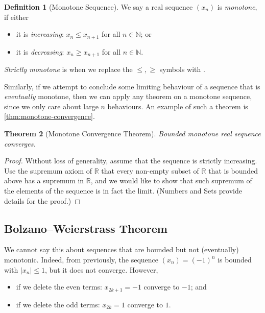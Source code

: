 \documentclass[11pt]{article}
\numberwithin{equation}{section}
\newtheorem{theorem}{Theorem}[section]
\theoremstyle{definition}
\newtheorem{definition}[theorem]{Definition}
\theoremstyle{remark}
\newcommand{\pqty}[1]{\left(#1\right)}
\newcommand{\abs}[1]{\left|#1\right|}
\newcommand{\RR}{\mathbb R}
\newcommand{\NN}{\mathbb N}
\begin{document}
\begin{definition}[Monotone Sequence]\label{analysis-unit-0014}
    \label{def:seq-monotone}%
    We say a real sequence \(\pqty{x_n}\) is \emph{monotone}, if either
    \begin{itemize}
        \item it is \emph{increasing}: \(x_n \leq x_{n + 1}\) for all \(n \in \NN\); or
        \item it is \emph{decreasing}: \(x_n \geq x_{n + 1}\) for all \(n \in \NN\).
    \end{itemize}

    \emph{Strictly monotone} is when we replace the \(\leq, \geq\) symbols with \(<, >\).
\end{definition}

Similarly, if we attempt to conclude some limiting behaviour of a sequence that is \emph{eventually} monotone, then we can apply any theorem on a monotone sequence, since we only care about large \(n\) behaviours. An example of such a theorem is \autoref{thm:monotone-convergence}.

\begin{theorem}[Monotone Convergence Theorem]\label{analysis-unit-0015}
    \label{thm:monotone-convergence}%
    Bounded monotone real sequence converges.
\end{theorem}

\begin{proof}
    Without loss of generality, assume that the sequence is strictly increasing. Use the supremum axiom of \(\RR\) that every non-empty subset of \(\RR\) that is bounded above has a supremum in \(\RR\), and we would like to show that such supremum of the elements of the sequence is in fact the limit. (Numbers and Sets provide details for the proof.)
\end{proof}

\subsection{Bolzano--Weierstrass Theorem}

We cannot say this about sequences that are bounded but not (eventually) monotonic. Indeed, from previously, the sequence \(\pqty{x_n} = \pqty{-1}^n\) is bounded with \(\abs{x_n} \leq 1\), but it does not converge. However,
\begin{itemize}
    \item if we delete the even terms: \(x_{2k + 1} = -1\) converge to \(-1\); and
    \item if we delete the odd terms: \(x_{2k} = 1\) converge to \(1\).
\end{itemize}
\end{document}
